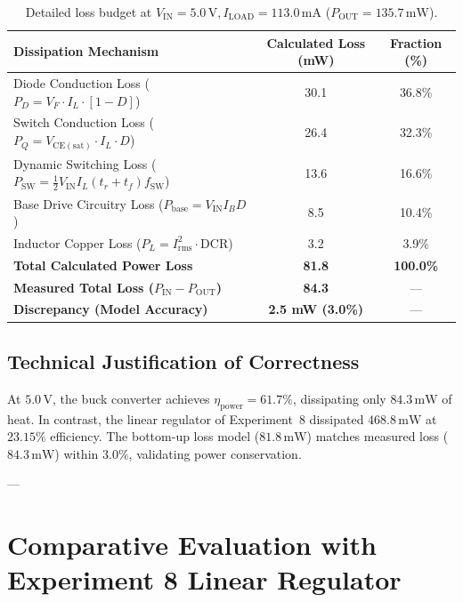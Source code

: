 \documentclass[11pt,a4paper]{article}
\begin{document}
\begin{table}[H]
\centering
\small
\caption{Detailed loss budget at $V_{\mathrm{IN}} = 5.0\,\mathrm{V}, I_{\mathrm{LOAD}} = 113.0\,\mathrm{mA}$ ($P_{\mathrm{OUT}} = 135.7\,\mathrm{mW}$).}
\label{tab:loss_budget}
\begin{tabular}{@{}lcc@{}}
\toprule
\textbf{Dissipation Mechanism} & \textbf{Calculated Loss (mW)} & \textbf{Fraction (\%)} \\ \midrule
Diode Conduction Loss ($P_D = V_F \cdot I_L \cdot [1 - D]$) & 30.1 & 36.8\% \\
Switch Conduction Loss ($P_Q = V_{\mathrm{CE(sat)}} \cdot I_L \cdot D$) & 26.4 & 32.3\% \\
Dynamic Switching Loss ($P_{\mathrm{SW}} = \frac{1}{2} V_{\mathrm{IN}} I_L (t_r + t_f) f_{\mathrm{SW}}$) & 13.6 & 16.6\% \\
Base Drive Circuitry Loss ($P_{\mathrm{base}} = V_{\mathrm{IN}} I_B D$) & 8.5 & 10.4\% \\
Inductor Copper Loss ($P_L = I_{\mathrm{rms}}^2 \cdot \mathrm{DCR}$) & 3.2 & 3.9\% \\ \midrule
\textbf{Total Calculated Power Loss} & \textbf{81.8} & \textbf{100.0\%} \\
\textbf{Measured Total Loss ($P_{\mathrm{IN}} - P_{\mathrm{OUT}}$)} & \textbf{84.3} & --- \\
\textbf{Discrepancy (Model Accuracy)} & \textbf{2.5 mW (3.0\%)} & --- \\
\bottomrule
\end{tabular}
\end{table}

\subsection{Technical Justification of Correctness}
At $5.0\,\mathrm{V}$, the buck converter achieves $\eta_{\mathrm{power}} = 61.7\%$, dissipating only $84.3\,\mathrm{mW}$ of heat. In contrast, the linear regulator of Experiment~8 dissipated $468.8\,\mathrm{mW}$ at $23.15\%$ efficiency. The bottom-up loss model ($81.8\,\mathrm{mW}$) matches measured loss ($84.3\,\mathrm{mW}$) within $3.0\%$, validating power conservation.

---

\section{Comparative Evaluation with Experiment 8 Linear Regulator}
\end{document}
